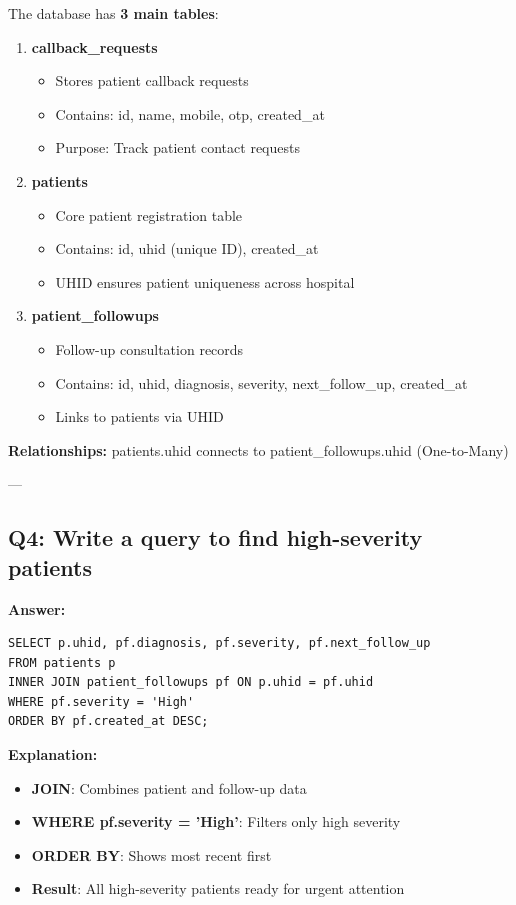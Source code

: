 \documentclass[12pt,a4paper]{article}
\begin{document}
The database has \textbf{3 main tables}:

\begin{enumerate}
    \item \textbf{callback\_requests}
    \begin{itemize}
        \item Stores patient callback requests
        \item Contains: id, name, mobile, otp, created\_at
        \item Purpose: Track patient contact requests
    \end{itemize}
    
    \item \textbf{patients}
    \begin{itemize}
        \item Core patient registration table
        \item Contains: id, uhid (unique ID), created\_at
        \item UHID ensures patient uniqueness across hospital
    \end{itemize}
    
    \item \textbf{patient\_followups}
    \begin{itemize}
        \item Follow-up consultation records
        \item Contains: id, uhid, diagnosis, severity, next\_follow\_up, created\_at
        \item Links to patients via UHID
    \end{itemize}
\end{enumerate}

\textbf{Relationships:} patients.uhid connects to patient\_followups.uhid (One-to-Many)

---

\subsection{Q4: Write a query to find high-severity patients}

\textbf{Answer:}

\begin{lstlisting}
SELECT p.uhid, pf.diagnosis, pf.severity, pf.next_follow_up
FROM patients p
INNER JOIN patient_followups pf ON p.uhid = pf.uhid
WHERE pf.severity = 'High'
ORDER BY pf.created_at DESC;
\end{lstlisting}

\textbf{Explanation:}
\begin{itemize}
    \item \textbf{JOIN}: Combines patient and follow-up data
    \item \textbf{WHERE pf.severity = 'High'}: Filters only high severity
    \item \textbf{ORDER BY}: Shows most recent first
    \item \textbf{Result}: All high-severity patients ready for urgent attention
\end{itemize}
\end{document}
